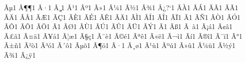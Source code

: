 {        {^^c2^^b5}{{\textmu}}1  %
        {^^c2^^b6}{{\P}}1  %
        {^^c2^^b7}{{\textperiodcentered}}1  %
        {^^c2^^b8}{{\c{}}}1  %
        {^^c2^^b9}{{\textonesuperior}}1  %
        {^^c2^^ba}{{\textordmasculine}}1  %
        {^^c2^^bb}{{\guillemotright}}1  %
        {^^c2^^bc}{{\textonequarter}}1  %
        {^^c2^^bd}{{\textonehalf}}1  %
        {^^c2^^be}{{\textthreequarters}}1  %
        {^^c2^^bf}{{?`}}1  %
        {^^c3^^80}{{\`{A}}}1  %
        {^^c3^^81}{{\'{A}}}1  %
        {^^c3^^82}{{\^{A}}}1  %
        {^^c3^^83}{{\~{A}}}1  %
        {^^c3^^84}{{\"{A}}}1  %
        {^^c3^^85}{{\AA}}1  %
        {^^c3^^86}{{\AE}}1  %
        {^^c3^^87}{{\c{C}}}1  %
        {^^c3^^88}{{\`{E}}}1  %
        {^^c3^^89}{{\'{E}}}1  %
        {^^c3^^8a}{{\^{E}}}1  %
        {^^c3^^8b}{{\"{A}}}1  %
        {^^c3^^8c}{{\`{I}}}1  %
        {^^c3^^8d}{{\'{I}}}1  %
        {^^c3^^8e}{{\^{I}}}1  %
        {^^c3^^8f}{{\"{I}}}1  %
        {^^c3^^90}{{\DH}}1  %
        {^^c3^^91}{{\~{N}}}1  %
        {^^c3^^92}{{\`{O}}}1  %
        {^^c3^^93}{{\'{O}}}1  %
        {^^c3^^94}{{\^{O}}}1  %
        {^^c3^^95}{{\~{O}}}1  %
        {^^c3^^96}{{\"{O}}}1  %
        {^^c3^^97}{{\texttimes}}1  %
        {^^c3^^98}{{\O}}1  %
        {^^c3^^99}{{\`{U}}}1  %
        {^^c3^^9a}{{\'{U}}}1  %
        {^^c3^^9b}{{\^{U}}}1  %
        {^^c3^^9c}{{\"{U}}}1  %
        {^^c3^^9d}{{\'{Y}}}1  %
        {^^c3^^9e}{{\TH}}1  %
        {^^c3^^9f}{{\ss}}1  %
        {^^c3^^a0}{{\`{a}}}1  %
        {^^c3^^a1}{{\'{a}}}1  %
        {^^c3^^a2}{{\^{a}}}1  %
        {^^c3^^a3}{{\~{a}}}1  %
        {^^c3^^a4}{{\"{a}}}1  %
        {^^c3^^a5}{{\aa}}1  %
        {^^c3^^a6}{{\ae}}1  %
        {^^c3^^a7}{{\c{c}}}1  %
        {^^c3^^a8}{{\`{e}}}1  %
        {^^c3^^a9}{{\'{e}}}1  %
        {^^c3^^aa}{{\^{e}}}1  %
        {^^c3^^ab}{{\"{e}}}1  %
        {^^c3^^ac}{{\`{i}}}1  %
        {^^c3^^ad}{{\'{i}}}1  %
        {^^c3^^ae}{{\^{i}}}1  %
        {^^c3^^af}{{\"{i}}}1  %
        {^^c3^^b0}{{\DH}}1  %
        {^^c3^^b1}{{\~{n}}}1  %
        {^^c3^^b2}{{\`{o}}}1  %
        {^^c3^^b3}{{\'{o}}}1  %
        {^^c3^^b4}{{\^{o}}}1  %
        {^^c3^^b5}{{\~{o}}}1  %
        {^^c3^^b6}{{\"{o}}}1  %
        {^^c3^^b7}{{\textdiv}}1  %
        {^^c3^^b8}{{\o}}1  %
        {^^c3^^b9}{{\`{u}}}1  %
        {^^c3^^ba}{{\'{u}}}1  %
        {^^c3^^bb}{{\^{u}}}1  %
        {^^c3^^bc}{{\"{u}}}1  %
        {^^c3^^bd}{{\'{y}}}1  %
        {^^c3^^be}{{\th}}1  %
        {^^c3^^bf}{{\"{y}}}1  %
}
